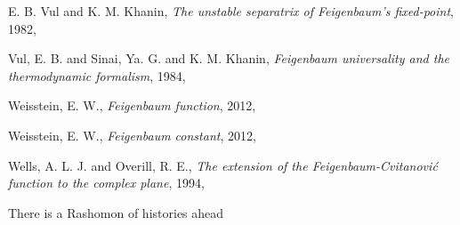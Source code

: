 \begin{description}
{E. B. Vul and K. M. Khanin},
{\em The unstable separatrix of {Feigenbaum}'s fixed-point},
{1982},

{Vul, E. B. and Sinai, Ya. G. and K. M. Khanin},
{\em Feigenbaum universality and the thermodynamic formalism},
{1984},

{Weisstein, E. W.},
{\em Feigenbaum function},
{2012},

{Weisstein, E. W.},
{\em Feigenbaum constant},
{2012},

{Wells, A. L. J. and Overill, R. E.},
{\em The extension of the {Feigenbaum-Cvitanovi{\'c}} function to the complex plane},
{1994},

\end{description}


There is a Rashomon of histories ahead

